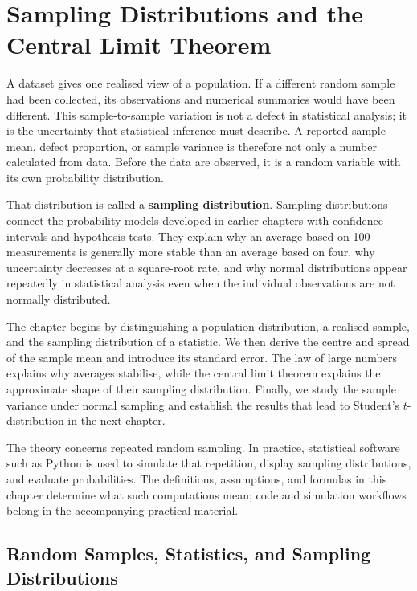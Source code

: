 \chapter{Sampling Distributions and the Central Limit Theorem}
\label{ch:sampling-distributions}

A dataset gives one realised view of a population. If a different random sample had been collected, its observations and numerical summaries would have been different. This sample-to-sample variation is not a defect in statistical analysis; it is the uncertainty that statistical inference must describe. A reported sample mean, defect proportion, or sample variance is therefore not only a number calculated from data. Before the data are observed, it is a random variable with its own probability distribution.

That distribution is called a \textbf{sampling distribution}. Sampling distributions connect the probability models developed in earlier chapters with confidence intervals and hypothesis tests. They explain why an average based on 100 measurements is generally more stable than an average based on four, why uncertainty decreases at a square-root rate, and why normal distributions appear repeatedly in statistical analysis even when the individual observations are not normally distributed.

The chapter begins by distinguishing a population distribution, a realised sample, and the sampling distribution of a statistic. We then derive the centre and spread of the sample mean and introduce its standard error. The law of large numbers explains why averages stabilise, while the central limit theorem explains the approximate shape of their sampling distribution. Finally, we study the sample variance under normal sampling and establish the results that lead to Student's $t$-distribution in the next chapter.

The theory concerns repeated random sampling. In practice, statistical software such as Python is used to simulate that repetition, display sampling distributions, and evaluate probabilities. The definitions, assumptions, and formulas in this chapter determine what such computations mean; code and simulation workflows belong in the accompanying practical material.

\section{Random Samples, Statistics, and Sampling Distributions}
\label{sec:random-samples-statistics}

